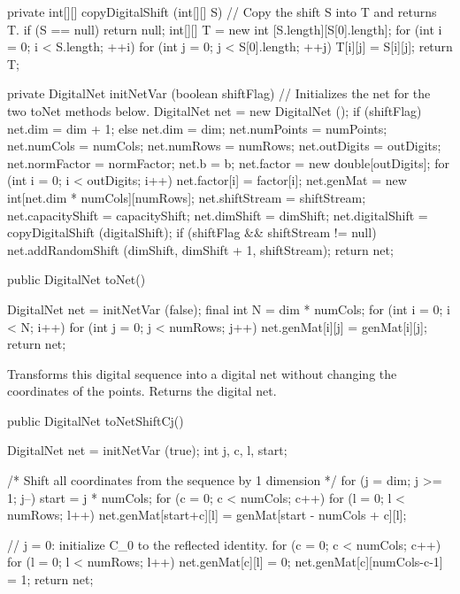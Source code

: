 \begin{code}\begin{hide}

   private int[][] copyDigitalShift (int[][] S) {
      // Copy the shift S into T and returns T.
      if (S == null) return null;
      int[][] T = new int [S.length][S[0].length];
      for (int i = 0; i < S.length; ++i)
         for (int j = 0; j < S[0].length; ++j)
            T[i][j] = S[i][j];
      return T;
   }

   private DigitalNet initNetVar (boolean shiftFlag) {
      // Initializes the net for the two toNet methods below.
      DigitalNet net = new DigitalNet ();
      if (shiftFlag)
         net.dim = dim + 1;
      else
         net.dim = dim;
      net.numPoints = numPoints;
      net.numCols = numCols;
      net.numRows = numRows;
      net.outDigits = outDigits;
      net.normFactor = normFactor;
      net.b = b;
      net.factor = new double[outDigits];
      for (int i = 0; i < outDigits; i++)
         net.factor[i] = factor[i];
      net.genMat = new int[net.dim * numCols][numRows];
      net.shiftStream = shiftStream;
      net.capacityShift = capacityShift;
      net.dimShift = dimShift;
      net.digitalShift = copyDigitalShift (digitalShift);
      if (shiftFlag && shiftStream != null) {
         net.addRandomShift (dimShift, dimShift + 1, shiftStream);
      }
      return net;
   } \end{hide}

   public DigitalNet toNet() \begin{hide} {
      DigitalNet net = initNetVar (false);
      final int N = dim * numCols;
      for (int i = 0; i < N; i++)
         for (int j = 0; j < numRows; j++)
            net.genMat[i][j] = genMat[i][j];
      return net;
   } \end{hide}
\end{code} 
\begin{tabb}
   Transforms this digital sequence into a digital net without changing
   the coordinates of the points. Returns the digital net.
\end{tabb}
\begin{code}

   public DigitalNet toNetShiftCj() \begin{hide} {
      DigitalNet net = initNetVar (true);
      int j, c, l, start;

      /* Shift all coordinates from the sequence by 1 dimension */
      for (j = dim; j >= 1; j--) {
         start = j * numCols;
         for (c = 0; c < numCols; c++)
            for (l = 0; l < numRows; l++) 
               net.genMat[start+c][l] = genMat[start - numCols + c][l];
      }

      // j = 0: initialize C_0 to the reflected identity.
      for (c = 0; c < numCols; c++) {
         for (l = 0; l < numRows; l++)
            net.genMat[c][l] = 0;
         net.genMat[c][numCols-c-1] = 1;
      }
      return net;
  }\end{hide}
\end{code} 

